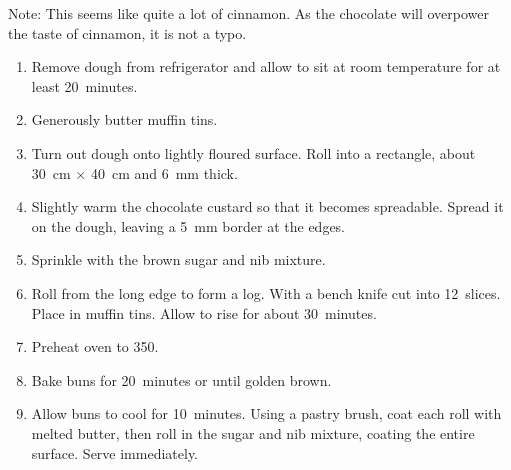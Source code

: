 Note: This seems like quite a lot of cinnamon.  As the chocolate will
overpower the taste of cinnamon, it is not a typo.



\begin{ingredients}
\end{ingredients}

\begin{recipe}
  \begin{enumerate}

  \item Remove dough from refrigerator and allow to sit at room
    temperature for at least 20~minutes.

  \item Generously butter  muffin tins.

  \item Turn out dough onto lightly floured surface.  Roll into a
    rectangle, about 30~cm $\times$ 40~cm and 6~mm thick.

  \item Slightly warm the chocolate custard so that it becomes spreadable.
    Spread it on the dough, leaving a 5~mm border at the edges.

  \item Sprinkle with the brown sugar and nib mixture.

  \item Roll from the long edge to form a log.  With a bench knife cut
    into 12~slices.  Place in muffin tins.  Allow to rise for about
    30~minutes.

  \item Preheat oven to 350\degreeC.

  \item Bake buns for 20~minutes or until golden brown.

  \item Allow buns to cool for 10~minutes.  Using a pastry brush, coat
    each roll with melted butter, then roll in the sugar and nib
    mixture, coating the entire surface.  Serve immediately.

  \end{enumerate}
\end{recipe}



